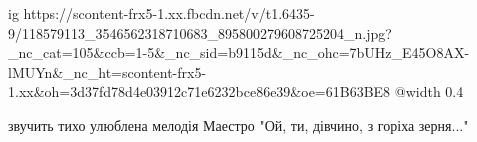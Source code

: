  
 
 
 
 

\ifcmt
  ig https://scontent-frx5-1.xx.fbcdn.net/v/t1.6435-9/118579113_3546562318710683_895800279608725204_n.jpg?_nc_cat=105&ccb=1-5&_nc_sid=b9115d&_nc_ohc=7bUHz_E45O8AX-lMUYn&_nc_ht=scontent-frx5-1.xx&oh=3d37fd78d4e03912c71e6232bce86e39&oe=61B63BE8
  @width 0.4
\fi


звучить тихо улюблена мелодія Маестро "Ой, ти, дівчино, з горіха зерня..."
